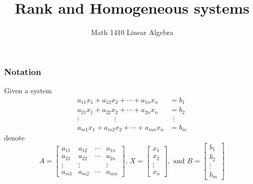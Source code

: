 \documentclass[12pt,t]{beamer}
\date{}
\author{Math 1410 Linear Algebra}
\title{Rank and Homogeneous systems}
\begin{document}
\begin{frame}
\titlepage
\end{frame}


\begin{frame}\frametitle{Notation}
 Given a system 
\begin{align*}
 a_{11}x_1+a_{12}x_2+\cdots + a_{1n}x_n & = b_1\\
 a_{21}x_1+a_{22}x_2+\cdots + a_{2n}x_n & = b_2\\
 \vdots \hspace{60pt} \vdots \hspace{48pt} & \hspace{6pt}\vdots\\
 a_{m1}x_1+a_{m2}x_2+\cdots + a_{mn}x_n & = b_m
\end{align*}
denote
\[
 A = \begin{bmatrix}a_{11} & a_{12} & \cdots & a_{1n}\\a_{21} & a_{22} & \cdots & a_{2n}\\ \vdots & \vdots & & \vdots\\a_{m1} & a_{m2} & \cdots & a_{mn}\end{bmatrix},\, X = \begin{bmatrix}x_1\\x_2\\\vdots\\ x_n\end{bmatrix}, \text{ and } B = \begin{bmatrix}b_1\\b_2\\ \vdots \\b_m\end{bmatrix}
\]
\end{frame}
\end{document}

